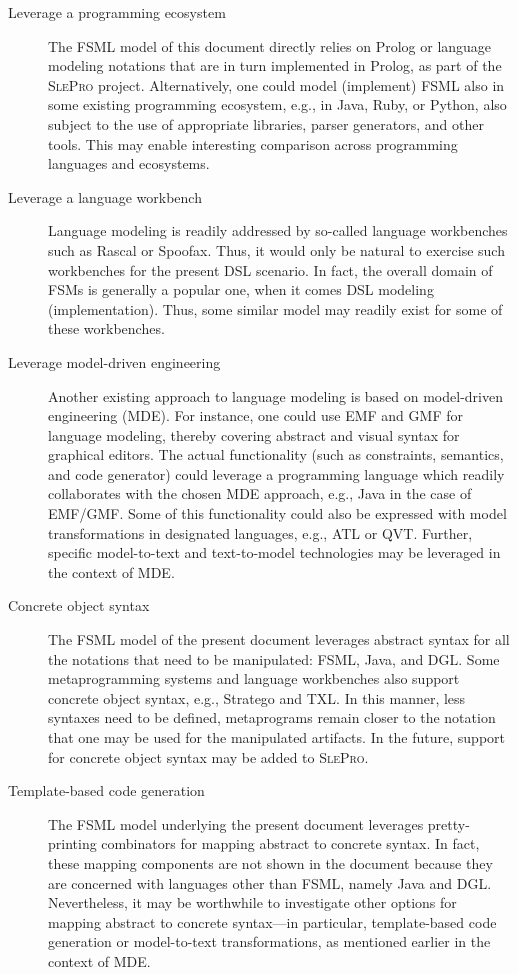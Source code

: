 \documentclass[preprint,authoryear,12pt]{noelsarticle}
\newcommand{\slepro}{\textsc{SlePro}}
\begin{document}
\begin{description}

\item[Leverage a programming ecosystem] The FSML model of
  this document directly relies on Prolog or language modeling
  notations that are in turn implemented in Prolog, as part of the
  \slepro{} project. Alternatively, one could model (implement) FSML
  also in some existing programming ecosystem, e.g., in Java, Ruby, or
  Python, also subject to the use of appropriate libraries, parser
  generators, and other tools. This may enable interesting comparison
  across programming languages and ecosystems.

\item[Leverage a language workbench] Language modeling is readily
  addressed by so-called language workbenches such as Rascal or
  Spoofax. Thus, it would only be natural to exercise such workbenches
  for the present DSL scenario. In fact, the overall domain of FSMs is
  generally a popular one, when it comes DSL modeling
  (implementation). Thus, some similar model may readily exist for
  some of these workbenches.

\item[Leverage model-driven engineering] Another existing approach to
  language modeling is based on model-driven engineering (MDE). For
  instance, one could use EMF and GMF for language modeling, thereby
  covering abstract and visual syntax for graphical editors. The
  actual functionality (such as constraints, semantics, and code
  generator) could leverage a programming language which readily
  collaborates with the chosen MDE approach, e.g., Java in the case of
  EMF/GMF. Some of this functionality could also be expressed with
  model transformations in designated languages, e.g., ATL or
  QVT. Further, specific model-to-text and text-to-model technologies
  may be leveraged in the context of MDE.

\item[Concrete object syntax] The FSML model of the present document
  leverages abstract syntax for all the notations that need to be
  manipulated: FSML, Java, and DGL. Some metaprogramming systems and
  language workbenches also support concrete object syntax, e.g.,
  Stratego and TXL. In this manner, less syntaxes need to be defined,
  metaprograms remain closer to the notation that one may be used for
  the manipulated artifacts. In the future, support for concrete
  object syntax may be added to \slepro.

\item[Template-based code generation] The FSML model underlying the
  present document leverages pretty-printing combinators for mapping
  abstract to concrete syntax. In fact, these mapping components are
  not shown in the document because they are concerned with languages
  other than FSML, namely Java and DGL. Nevertheless, it may be
  worthwhile to investigate other options for mapping abstract to
  concrete syntax---in particular, template-based code generation or
  model-to-text transformations, as mentioned earlier in the context
  of MDE.


\end{description}
\end{document}
